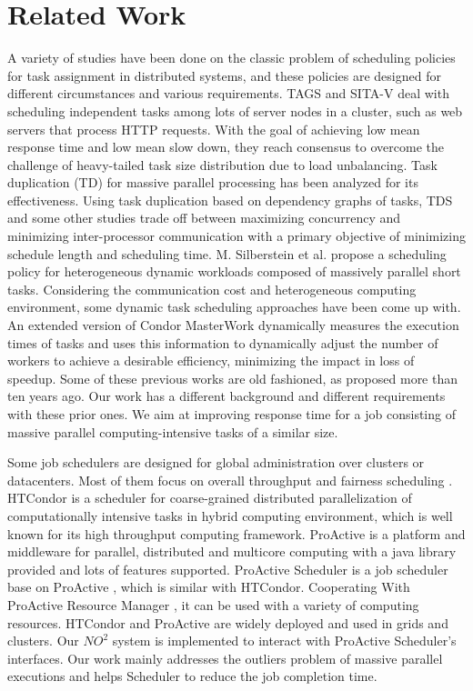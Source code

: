 \section{Related Work} \label{sec-related}

A variety of studies have been done on the classic problem of scheduling policies for task
assignment in distributed systems, and these policies are designed for different
circumstances and various requirements. TAGS \cite{balter} and SITA-V
\cite{Crovella:1998:TAD:277851.277942} deal with scheduling independent tasks among lots
of server nodes in a cluster, such as web servers that process HTTP requests. With the goal of
achieving low mean response time and low mean slow down, they reach consensus to
overcome the challenge of heavy-tailed task size distribution due to load unbalancing.
Task duplication (TD) \cite{Manoharan:2001:ETD:373047.373064} for massive parallel
processing has been analyzed for its effectiveness. Using task duplication based on
dependency graphs of tasks, TDS \cite{rohtua} and some other studies \cite{ahmad}
\cite{Dogan:2002:LDB:850943.853100} trade off between maximizing concurrency and
minimizing inter-processor communication with a primary objective of minimizing schedule
length and scheduling time. M. Silberstein et al. \cite{silberstein} propose a scheduling
policy for heterogeneous dynamic workloads composed of massively parallel short tasks.
Considering the communication cost and heterogeneous computing environment, some dynamic
task scheduling approaches \cite{Ahmad:1991:SLB:126283.126284} \cite{ucar} have been come up
with. An extended version of Condor MasterWork \cite{Heymann:2000:ASM:645440.652833}
dynamically measures the execution times of tasks and uses this information to dynamically
adjust the number of workers to achieve a desirable efficiency, minimizing the impact in
loss of speedup. Some of these previous works are old fashioned, as proposed
more than ten years ago. Our work has a different background and different
requirements with these prior ones. We aim at improving response time for a job
consisting of massive parallel computing-intensive tasks of a similar size.

Some job schedulers are designed for global administration over clusters
or datacenters. Most of them focus on overall throughput and fairness scheduling
\cite{isard2009}. HTCondor \cite{beowulfbook-condor} is a scheduler for coarse-grained
distributed parallelization of computationally intensive tasks in hybrid computing
environment, which is well known for its high throughput computing framework. ProActive is
a platform and middleware for parallel, distributed and multicore computing with a java
library provided and lots of features supported. ProActive Scheduler \cite{pascheduling} is a
job scheduler base on ProActive \cite{paprogramming} , which is similar with HTCondor.
Cooperating With ProActive Resource Manager \cite{parm} , it can be used with a variety of
computing resources. HTCondor and ProActive are widely deployed and used in grids and
clusters. Our $NO^2$ system is implemented to interact with ProActive Scheduler's
interfaces. Our work mainly addresses the outliers problem of massive parallel executions
and helps Scheduler to reduce the job completion time.


